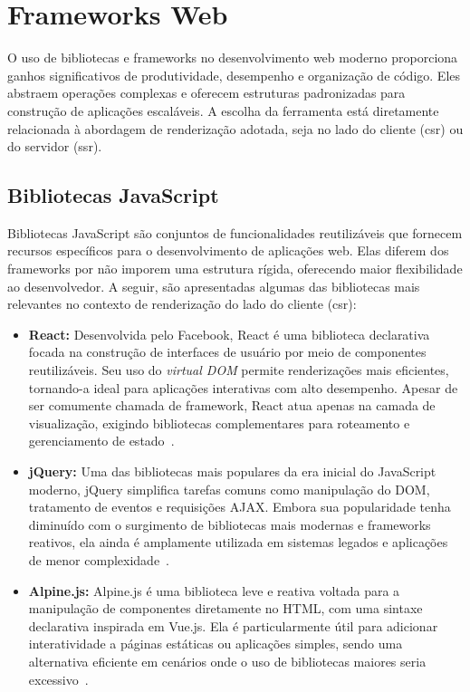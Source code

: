 \section{Frameworks Web}
\label{sec:frameworks-web}

O uso de bibliotecas e frameworks no desenvolvimento web moderno proporciona ganhos significativos de produtividade, desempenho e organização de código. Eles abstraem operações complexas e oferecem estruturas padronizadas para construção de aplicações escaláveis. A escolha da ferramenta está diretamente relacionada à abordagem de renderização adotada, seja no lado do cliente (\acrshort{csr}) ou do servidor (\acrshort{ssr}).

\subsection{Bibliotecas JavaScript}
\label{subsec:bibliotecas-js}

Bibliotecas JavaScript são conjuntos de funcionalidades reutilizáveis que fornecem recursos específicos para o desenvolvimento de aplicações web. Elas diferem dos frameworks por não imporem uma estrutura rígida, oferecendo maior flexibilidade ao desenvolvedor. A seguir, são apresentadas algumas das bibliotecas mais relevantes no contexto de renderização do lado do cliente (\acrshort{csr}):


\begin{itemize}
  \item \textbf{React:} Desenvolvida pelo Facebook, React é uma biblioteca declarativa focada na construção de interfaces de usuário por meio de componentes reutilizáveis. Seu uso do \textit{virtual DOM} permite renderizações mais eficientes, tornando-a ideal para aplicações interativas com alto desempenho. Apesar de ser comumente chamada de framework, React atua apenas na camada de visualização, exigindo bibliotecas complementares para roteamento e gerenciamento de estado~\cite{react2025}.

  \item \textbf{jQuery:} Uma das bibliotecas mais populares da era inicial do JavaScript moderno, jQuery simplifica tarefas comuns como manipulação do DOM, tratamento de eventos e requisições AJAX. Embora sua popularidade tenha diminuído com o surgimento de bibliotecas mais modernas e frameworks reativos, ela ainda é amplamente utilizada em sistemas legados e aplicações de menor complexidade~\cite{jquery2023}.

  \item \textbf{Alpine.js:} Alpine.js é uma biblioteca leve e reativa voltada para a manipulação de componentes diretamente no HTML, com uma sintaxe declarativa inspirada em Vue.js. Ela é particularmente útil para adicionar interatividade a páginas estáticas ou aplicações simples, sendo uma alternativa eficiente em cenários onde o uso de bibliotecas maiores seria excessivo~\cite{alpinejs2023}.
\end{itemize}

